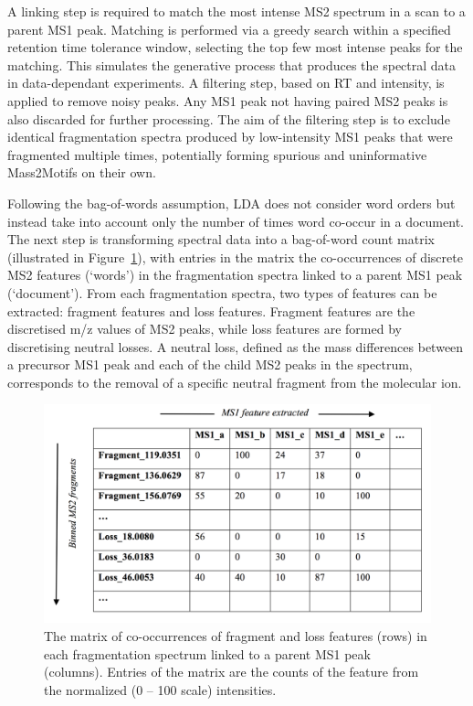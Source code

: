 A linking step is required to match the most intense MS2 spectrum in a scan to a parent MS1 peak. Matching is performed via a greedy search within a specified retention time tolerance window, selecting the top few most intense peaks for the matching. This simulates the generative process that produces the spectral data in data-dependant experiments. A filtering step, based on RT and intensity, is applied to remove noisy peaks. Any MS1 peak not having paired MS2 peaks is also discarded for further processing. The aim of the filtering step is to exclude identical fragmentation spectra produced by low-intensity MS1 peaks that were fragmented multiple times, potentially forming spurious and uninformative Mass2Motifs on their own. 

Following the bag-of-words assumption, LDA does not consider word orders but instead take into account only the number of times word co-occur in a document. The next step is transforming spectral data into a bag-of-word count matrix (illustrated in Figure~\ref{fig:m2lda-matrix}), with entries in the matrix the co-occurrences of discrete MS2 features (`words') in the fragmentation spectra linked to a parent MS1 peak (`document'). From each fragmentation spectra, two types of features can be extracted: fragment features and loss features. Fragment features are the discretised m/z values of MS2 peaks, while loss features are formed by discretising neutral losses. A neutral loss, defined as the mass differences between a precursor MS1 peak and each of the child MS2 peaks in the spectrum, corresponds to the removal of a specific neutral fragment from the molecular ion. 

\begin{figure}[!htbp]
\centering\includegraphics[width=0.8\linewidth]{07-lda/figures/matrix.png}
\centering\caption{The matrix of co-occurrences of fragment and loss features (rows) in each fragmentation spectrum linked to a parent MS1 peak (columns). Entries of the matrix are the counts of the feature from the normalized (0 – 100 scale) intensities.\label{fig:m2lda-matrix}}
\end{figure}

